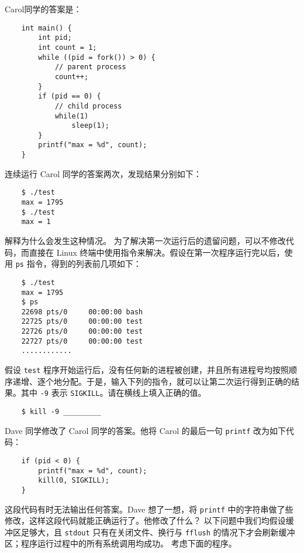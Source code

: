 \begin{problems}
            \qn Carol同学的答案是：
            \begin{verbatim}
    int main() {
        int pid;
        int count = 1;
        while ((pid = fork()) > 0) {
            // parent process
            count++;
        } 
        if (pid == 0) {
            // child process
            while(1)
                sleep(1);
        } 
        printf("max = %d", count);
    }
            \end{verbatim}
            连续运行 Carol 同学的答案两次，发现结果分别如下：
            \begin{verbatim}
    $ ./test
    max = 1795
    $ ./test
    max = 1
            \end{verbatim}
                \subqn 解释为什么会发生这种情况。
                \subqn 为了解决第一次运行后的遗留问题，可以不修改代码，而直接在 Linux 终端中使用指令来解决。假设在第一次程序运行完以后，使用 \verb|ps| 指令，得到的列表前几项如下：
                \begin{verbatim}
    $ ./test
    max = 1795
    $ ps
    22698 pts/0     00:00:00 bash
    22725 pts/0     00:00:00 test
    22726 pts/0     00:00:00 test
    22727 pts/0     00:00:00 test
    ............
                \end{verbatim}
                假设 \verb|test| 程序开始运行后，没有任何新的进程被创建，并且所有进程号均按照顺序递增、逐个地分配。于是，输入下列的指令，就可以让第二次运行得到正确的结果。其中 \verb|-9| 表示 \verb|SIGKILL|。请在横线上填入正确的值。
                \begin{verbatim}
    $ kill -9 _________
                \end{verbatim}
            \qn Dave 同学修改了 Carol 同学的答案。他将 Carol 的最后一句 \verb|printf| 改为如下代码：
            \begin{verbatim}
    if (pid < 0) {
        printf("max = %d", count);
        kill(0, SIGKILL);
    }
            \end{verbatim}
            这段代码有时无法输出任何答案。Dave 想了一想，将 \verb|printf| 中的字符串做了些修改，这样这段代码就能正确运行了。他修改了什么？
        \pro 以下问题中我们均假设缓冲区足够大，且 \verb|stdout| 只有在关闭文件、换行与 \verb|fflush| 的情况下才会刷新缓冲区；程序运行过程中的所有系统调用均成功。
        \qn 考虑下面的程序。
        \begin{verbatim}

\end{verbatim}
\end{problems}
